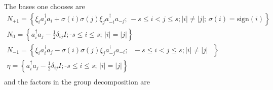 \documentclass{amsart}
\begin{document}
The bases one chooses are
\[
\begin{array}{c}
 N_{+1} =\left\{ {\xi _i a_j^\dag a_i +\sigma \left( i \right)\sigma \left(
j \right)\xi _j a_{-i}^\dag a_{-j} \mbox{; }-s\leqslant i<j\leqslant
s;\left| i \right|\ne \left| j \right|\mbox{; }\sigma \left( i
\right)=\mbox{sign}(i)} \right\} \\
 N_0 =\left\{ {a_i^\dag a_j -\frac{1}{2}\delta _{ij} I;\mbox{-}s\leqslant
i\leqslant s\mbox{; }\left| i \right|=\left| j \right|} \right\} \\
 N_{-1} =\left\{ {\xi _i a_i^\dag a_j -\sigma \left( i \right)\sigma \left(
j \right)\xi _j a_{-j}^\dag a_{-i} ;\mbox{ }-s\leqslant i<j\leqslant
s;\left| i \right|\ne \left| j \right|\mbox{ }} \right\} \\
 \eta =\left\{ {a_i^\dag a_j -\frac{1}{2}\delta _{ij} I;\mbox{-}s\leqslant
i\leqslant s\mbox{; }\left| i \right|=\left| j \right|} \right\} \\
 \end{array}
\]
and the factors in the group decomposition are
\end{document}
